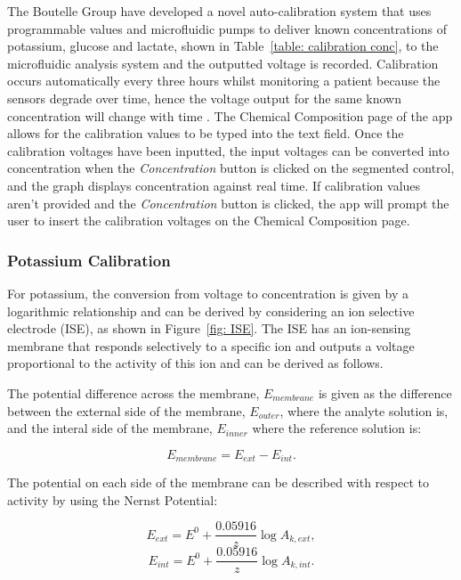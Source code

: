 The Boutelle Group have developed a novel auto-calibration system that uses programmable values and microfluidic pumps to deliver known concentrations of potassium, glucose and lactate, shown in Table~\ref{table: calibration conc}, to the microfluidic analysis system and the outputted voltage is recorded. Calibration occurs automatically every three hours whilst monitoring a patient because the sensors degrade over time, hence the voltage output for the same known concentration will change with time \cite{Rogers2017}. The Chemical Composition page of the app allows for the calibration values to be typed into the text field. Once the calibration voltages have been inputted, the input voltages can be converted into concentration when the \textit{Concentration} button is clicked on the segmented control, and the graph displays concentration against real time. If calibration values aren't provided and the \textit{Concentration} button is clicked, the app will prompt the user to insert the calibration voltages on the Chemical Composition page. 

\subsubsection{Potassium Calibration}

For potassium, the conversion from voltage to concentration is given by a logarithmic relationship and can be derived by considering an ion selective electrode (ISE), as shown in Figure~\ref{fig: ISE}. The ISE has an ion-sensing membrane that responds selectively to a specific ion and outputs a voltage proportional to the activity of this ion \cite{Rogers2017, LibreTexts2019} and can be derived as follows. 

The potential difference across the membrane, $E_{membrane}$ is given as the difference between the external side of the membrane, $E_{outer}$, where the analyte solution is, and the interal side of the membrane, $E_{inner}$ where the reference solution is:

\begin{equation}
    E_{membrane} = E_{ext} - E_{int}.
    \label{equation: membrane potential}
\end{equation}

The potential on each side of the membrane can be described with respect to activity by using the Nernst Potential:

\begin{equation}
    E_{ext} = E^{0} + \frac{0.05916}{z}\log A_{k,ext}, 
    \label{equation: outer Nernst} 
\end{equation}
\begin{equation}
    E_{int} = E^{0} + \frac{0.05916}{z}\log A_{k,int}.
    \label{equation: inner Nernst}
\end{equation}

